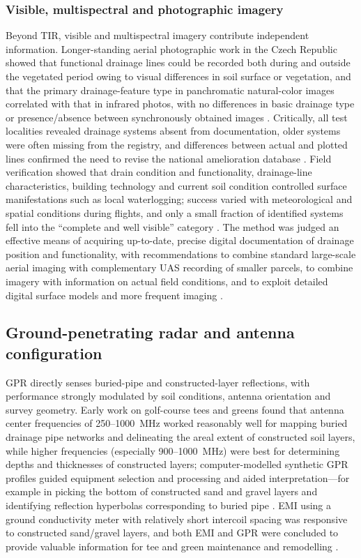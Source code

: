 \documentclass[11pt]{article}
\begin{document}
\subsubsection{Visible, multispectral and photographic imagery}

Beyond TIR, visible and multispectral imagery contribute independent information. Longer-standing aerial photographic work in the Czech Republic showed that functional drainage lines could be recorded both during and outside the vegetated period owing to visual differences in soil surface or vegetation, and that the primary drainage-feature type in panchromatic natural-color images correlated with that in infrared photos, with no differences in basic drainage type or presence/absence between synchronously obtained images \parencite{Tlapáková2017}. Critically, all test localities revealed drainage systems absent from documentation, older systems were often missing from the registry, and differences between actual and plotted lines confirmed the need to revise the national amelioration database \parencite{Tlapáková2017}. Field verification showed that drain condition and functionality, drainage-line characteristics, building technology and current soil condition controlled surface manifestations such as local waterlogging; success varied with meteorological and spatial conditions during flights, and only a small fraction of identified systems fell into the ``complete and well visible'' category \parencite{Tlapáková2017}. The method was judged an effective means of acquiring up-to-date, precise digital documentation of drainage position and functionality, with recommendations to combine standard large-scale aerial imaging with complementary UAS recording of smaller parcels, to combine imagery with information on actual field conditions, and to exploit detailed digital surface models and more frequent imaging \parencite{Tlapáková2017}.

\subsection{Ground-penetrating radar and antenna configuration}

GPR directly senses buried-pipe and constructed-layer reflections, with performance strongly modulated by soil conditions, antenna orientation and survey geometry. Early work on golf-course tees and greens found that antenna center frequencies of 250--1000~MHz worked reasonably well for mapping buried drainage pipe networks and delineating the areal extent of constructed soil layers, while higher frequencies (especially 900--1000~MHz) were best for determining depths and thicknesses of constructed layers; computer-modelled synthetic GPR profiles guided equipment selection and processing and aided interpretation---for example in picking the bottom of constructed sand and gravel layers and identifying reflection hyperbolas corresponding to buried pipe \parencite{Allred2005}. EMI using a ground conductivity meter with relatively short intercoil spacing was responsive to constructed sand/gravel layers, and both EMI and GPR were concluded to provide valuable information for tee and green maintenance and remodelling \parencite{Allred2005}.
\end{document}
